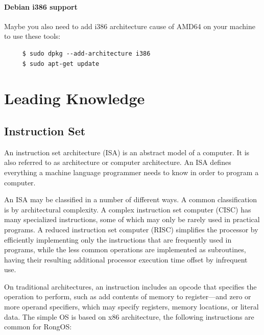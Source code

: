 \documentclass{swfcthesis}
\begin{document}
\subsubsection{Debian i386 support}
\label{sec:debian-i386-support}

Maybe you also need to add i386 architecture cause of AMD64 on your machine to use these
tools:

\begin{verbatim}
     $ sudo dpkg --add-architecture i386
     $ sudo apt-get update
\end{verbatim}

\chapter{Leading Knowledge}
\label{cha:leading-knowledge}

\section{Instruction Set}
\label{sec:instruction-set}

An instruction set architecture (ISA) is an abstract model of a computer. It is also
referred to as architecture or computer architecture. An ISA defines everything a machine
language programmer needs to know in order to program a computer.

An ISA may be classified in a number of different ways. A common classification is by
architectural complexity. A complex instruction set computer (CISC) has many specialized
instructions, some of which may only be rarely used in practical programs. A reduced
instruction set computer (RISC) simplifies the processor by efficiently implementing only
the instructions that are frequently used in programs, while the less common operations
are implemented as subroutines, having their resulting additional processor execution time
offset by infrequent use.

On traditional architectures, an instruction includes an opcode that specifies the
operation to perform, such as add contents of memory to register—and zero or more operand
specifiers, which may specify registers, memory locations, or literal
data. The simple OS is based on x86 architecture, the following instructions are common
for RongOS:
\end{document}
